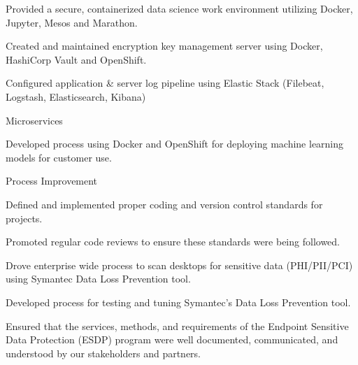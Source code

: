 \documentclass[]{deedy-resume-openfont}
\begin{document}
\begin{tightemize}
\begin{tightemize}
    \item Provided a secure, containerized data science work environment utilizing Docker, Jupyter, Mesos and Marathon.
    \item Created and maintained encryption key management server using Docker, HashiCorp Vault and OpenShift.
    \item Configured application \& server log pipeline using Elastic Stack (Filebeat, Logstash, Elasticsearch, Kibana)
    \end{tightemize}
    \vspace{\topsep}
\item Microservices
    \vspace{\topsep}
    \begin{tightemize}
    \item Developed process using Docker and OpenShift for deploying machine learning models for customer use.
    \end{tightemize}
    \vspace{\topsep}
\item Process Improvement
    \vspace{\topsep}
    \begin{tightemize}
    \item Defined and implemented proper coding and version control standards for projects.
    \item Promoted regular code reviews to ensure these standards were being followed.
    \end{tightemize}
    \vspace{\topsep}
\end{tightemize}
\sectionsep

\vspace{\topsep} 
\begin{tightemize}
\item Drove enterprise wide process to scan desktops for sensitive data (PHI/PII/PCI) using Symantec Data Loss Prevention tool.
\item Developed process for testing and tuning Symantec's Data Loss Prevention tool.
\item Ensured that the services, methods, and requirements of the Endpoint Sensitive Data Protection (ESDP) program were well documented, communicated, and understood by our stakeholders and partners.
\end{tightemize}
\sectionsep
\end{document}
